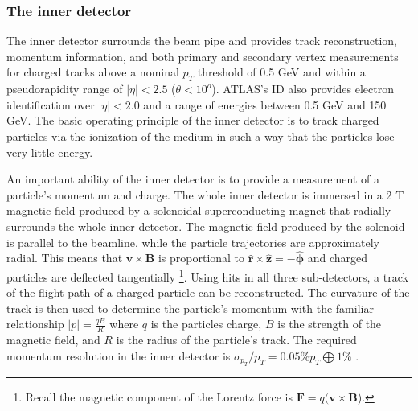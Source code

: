 \subsubsection{The inner detector}
\label{subsubsec:id}
The inner detector surrounds the beam pipe and provides track reconstruction,
momentum information, and both primary and secondary vertex measurements for
charged tracks above a nominal $p_{T}$ threshold of 0.5 GeV and within
a pseudorapidity range of $|\eta| < 2.5$ ($\theta < 10^o$). ATLAS's ID also provides electron
identification over $|\eta| < 2.0$ and 
a range of energies between 0.5 GeV and 150 GeV. The basic
operating principle of the inner detector is to track charged particles
via the ionization of the medium in such a way that the particles lose very
little energy. 

An important ability of the inner detector is to provide a measurement of
a particle's momentum and charge. The whole inner detector is immersed in a 2 T
magnetic field produced by a solenoidal superconducting magnet that radially
surrounds the whole inner detector. The magnetic field produced by the
solenoid is parallel to the beamline, while the particle trajectories are
approximately radial. This means that $\mathbf{v} \times \mathbf{B}$ is proportional
to $\mathbf{\hat r} \times \mathbf{\hat z} = -\mathbf{\hat \phi}$ and
charged particles are deflected tangentially
\footnote{Recall the magnetic
component of the Lorentz force is $\mathbf{F} = q(\mathbf{v} \times \mathbf{B}$).}.
Using hits in all three sub-detectors, a
track of the flight path of a charged particle can be reconstructed. The
curvature of the track is then used to determine the particle's
momentum with the familiar relationship $|p| = \frac{q B}{R}$
where $q$ is the particles charge, $B$ is the strength of the magnetic field, and 
$R$ is the radius of the particle's track. The required momentum resolution
in the inner detector is $\sigma_{p_T}/p_T = 0.05\% p_T \bigoplus 1\%$
\cite{Innerdesign}.

